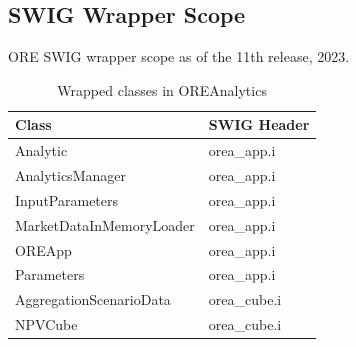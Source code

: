 \documentclass[12pt, a4paper]{report}
\begin{document}
\begin{appendix}

\chapter{SWIG Wrapper Scope}
\label{app:swig}

ORE SWIG wrapper scope as of the 11th release, 2023.

{
\scriptsize
\begin{center}
\begin{longtable}{|l|l|}
\caption{Wrapped classes in OREAnalytics\\ \vspace{0.5cm}} \\ 
\hline
  Class & SWIG Header \\
  \hline
  Analytic & orea\_app.i \\
  AnalyticsManager & orea\_app.i \\
  InputParameters & orea\_app.i \\
  MarketDataInMemoryLoader & orea\_app.i \\
  OREApp & orea\_app.i \\
  Parameters & orea\_app.i \\
  AggregationScenarioData & orea\_cube.i \\
  NPVCube & orea\_cube.i \\
  \hline
\end{longtable}
\end{center}
}


\end{appendix}
\end{document}
